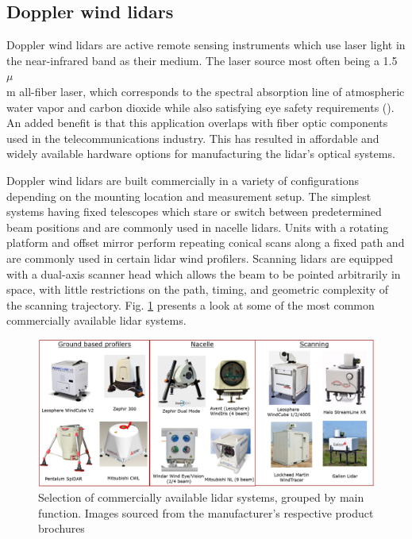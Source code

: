 \subsection{Doppler wind lidars}
\label{sec:intro_lidar}

Doppler wind lidars are active remote sensing instruments which use laser light in the near-infrared band as their medium. The laser source most often being a 1.5 $\mu$\\m all-fiber laser, which corresponds to the spectral absorption line of atmospheric water vapor and carbon dioxide while also satisfying eye safety requirements (\cite{cariou_laser_2006}). An added benefit is that this application overlaps with fiber optic components used in the telecommunications industry. This has resulted in affordable and widely available hardware options for manufacturing the lidar's optical systems.

Doppler wind lidars are built commercially in a variety of configurations depending on the mounting location and measurement setup. The simplest systems having fixed telescopes which stare or switch between predetermined beam positions and are commonly used in nacelle lidars. Units with a rotating platform and offset mirror perform repeating conical scans along a fixed path and are commonly used in certain lidar wind profilers. Scanning lidars are equipped with a dual-axis scanner head which allows the beam to be pointed arbitrarily in space, with little restrictions on the path, timing, and geometric complexity of the scanning trajectory. Fig. \ref{fig:lidars} presents a look at some of the most common commercially available lidar systems.

\begin{figure}[htbp]
    \centering
        \includegraphics[width=1.0\textwidth]{graphics/intro/lidars.png}
    \caption{Selection of commercially available lidar systems, grouped by main function. Images sourced from the manufacturer's respective product brochures}
    \label{fig:lidars}
\end{figure}

